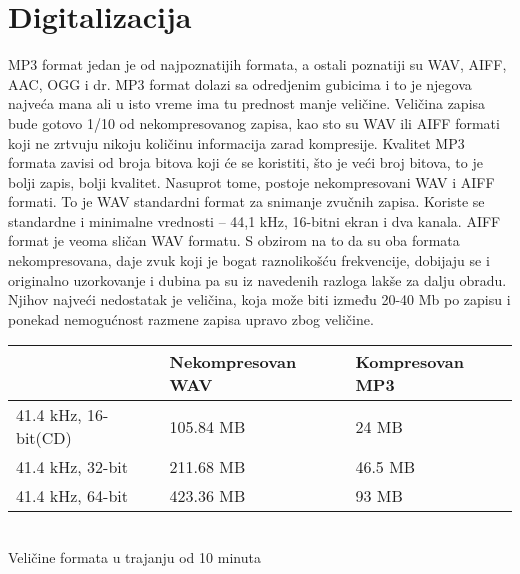 \documentclass[11pt]{article}
\begin{document}
\section{Digitalizacija}
        MP3 format jedan je od najpoznatijih formata, a ostali poznatiji su WAV, AIFF, AAC,
        OGG i dr. MP3 format dolazi sa odredjenim gubicima i to je njegova najveća mana ali u isto vreme ima tu prednost manje veličine. Veličina zapisa bude gotovo 1/10 od nekompresovanog zapisa, kao sto su WAV ili AIFF formati koji ne zrtvuju nikoju količinu informacija zarad kompresije. Kvalitet
        MP3 formata zavisi od broja bitova koji će se koristiti, što je veći broj bitova, to je bolji zapis,
        bolji kvalitet. Nasuprot tome, postoje nekompresovani WAV i AIFF formati. To je WAV
        standardni format za snimanje zvučnih zapisa. Koriste se standardne i minimalne
        vrednosti – 44,1 kHz, 16-bitni ekran i dva kanala. AIFF format je veoma sličan WAV formatu.
        S obzirom na to da su oba formata nekompresovana, daje zvuk koji je bogat raznolikošću
        frekvencije, dobijaju se i originalno uzorkovanje i dubina pa su iz navedenih razloga
        lakše za dalju obradu. Njihov najveći nedostatak je veličina, koja može biti između 20-40 Mb po
        zapisu i ponekad nemogućnost razmene zapisa upravo zbog veličine.
        
     
  
            \begin{center}
     
        \begin{tabular}{lll} \hline
        & Nekompresovan WAV & Kompresovan MP3 \\ \hline
        41.4 kHz, 16-bit(CD) & 105.84 MB & 24 MB \\ \hline
        41.4 kHz, 32-bit & 211.68 MB & 46.5 MB \\ \hline
        41.4 kHz, 64-bit & 423.36 MB & 93 MB
        \end{tabular} 
            \\Veličine formata u trajanju od 10 minuta
            \end{center}
        
\end{document}

